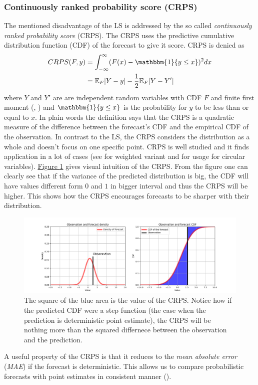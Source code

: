 \documentclass[12pt,a4paper,twoside]{scrartcl}
\numberwithin{equation}{section}
\newcommand{\reffig}[1]{\hyperref[#1]{Figure \ref*{#1}}}
\begin{document}
\subsubsection{Continuously ranked probability score (CRPS)}\label{sec:crps}
The mentioned disadvantage of the LS is addressed by the so called \emph{continuously ranked probability score} (CRPS). The CRPS uses the predictive cumulative distribution function (CDF) of the forecast to give it score. CRPS is denied as
\begin{align}
  \label{eq:crps}
  CRPS(F,y)  &= \int_{-\infty}^{\infty}(F(x) - \mathbbm{1}\{y \leq x \})^2dx \\
             &= \mathbb{E}_F|Y - y| - \frac{1}{2}\mathbb{E}_F|Y - Y'|
\end{align}
where \(Y\) and \(Y'\) are are independent random variables with CDF \(F\) and finite first moment (\cite{rafteryg2007}, \cite{matheson1976}) and \(\mathbbm{1}\{y \leq x \}\) is the probability for \(y\) to be less than or equal to \(x \). In plain words the definition says that the CRPS is a quadratic measure of the difference between the forecast's CDF and the empirical CDF of the observation. In contrast to the LS, the CRPS considers the distribution as a whole and doesn't focus on one specific point. CRPS is well studied and it finds application in a lot of cases (see \cite{ranjan2011} for weighted variant and \cite{grimit2007} for usage for circular variables). \reffig{fig:crps} gives visual intuition of the CRPS. From the figure one can clearly see that if the variance of the predicted distribution is big, the CDF will have values different form \(0\) and \(1\) in bigger interval and thus the CRPS will be higher. This shows how the CRPS  encourages forecasts to be sharper with their distribution.
\vfill
\begin{center}
  \begin{figure}[H]
    \centering
    \includegraphics[height=0.41\textwidth, width=1\textwidth]{figures/crps.png}
    \caption[Continuous Rank Probability Score Intuition]{The square of the blue area is the value of the CRPS. Notice how if the predicted CDF were a step function (the case when the prediction is deterministic point estimate), the CRPS will be nothing more than the squared differnece between the observation and the prediction.}\label{fig:crps}
  \end{figure}
\end{center}
A useful property of the CRPS is that it reduces to the \emph{mean absolute error} (\emph{MAE}) if the forecast is deterministic. This allows us to compare probabilistic forecasts with point estimates in consistent manner (\cite{gneiting2014}).
\end{document}
